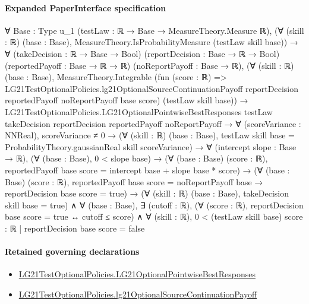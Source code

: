\documentclass[10pt]{article}
\begin{document}
\paragraph{Expanded PaperInterface specification}
\begin{ReviewVerbatim}
∀ {Base : Type u_1} (testLaw : ℝ → Base → MeasureTheory.Measure ℝ),
  (∀ (skill : ℝ) (base : Base), MeasureTheory.IsProbabilityMeasure (testLaw skill base)) →
    ∀ (takeDecision : ℝ → Base → Bool) (reportDecision : Base → ℝ → Bool) (reportedPayoff : Base → ℝ → ℝ)
      (noReportPayoff : Base → ℝ),
      (∀ (skill : ℝ) (base : Base),
          MeasureTheory.Integrable
            (fun (score : ℝ) =>
              LG21TestOptionalPolicies.lg21OptionalSourceContinuationPayoff reportDecision reportedPayoff noReportPayoff
                base score)
            (testLaw skill base)) →
        LG21TestOptionalPolicies.LG21OptionalPointwiseBestResponses testLaw takeDecision reportDecision reportedPayoff
            noReportPayoff →
          ∀ (scoreVariance : NNReal),
            scoreVariance ≠ 0 →
              (∀ (skill : ℝ) (base : Base), testLaw skill base = ProbabilityTheory.gaussianReal skill scoreVariance) →
                ∀ (intercept slope : Base → ℝ),
                  (∀ (base : Base), 0 < slope base) →
                    (∀ (base : Base) (score : ℝ), reportedPayoff base score = intercept base + slope base * score) →
                      (∀ (base : Base) (score : ℝ),
                          reportedPayoff base score = noReportPayoff base → reportDecision base score = true) →
                        (∀ (skill : ℝ) (base : Base), takeDecision skill base = true) ∧
                          ∀ (base : Base),
                            ∃ (cutoff : ℝ),
                              (∀ (score : ℝ), reportDecision base score = true ↔ cutoff ≤ score) ∧
                                ∀ (skill : ℝ), 0 < (testLaw skill base) {score : ℝ | reportDecision base score = false}
\end{ReviewVerbatim}

\paragraph{Retained governing declarations}
\begin{itemize}\raggedright
\item \hyperlink{paper-prerequisite-c2c420f15bf99600}{LG21\allowbreak{}Test\allowbreak{}Optional\allowbreak{}Policies.\allowbreak{}LG21\allowbreak{}Optional\allowbreak{}Pointwise\allowbreak{}Best\allowbreak{}Responses}
\item \hyperlink{governing-declaration-ced20498d7fb3845}{LG21\allowbreak{}Test\allowbreak{}Optional\allowbreak{}Policies.\allowbreak{}lg21\allowbreak{}Optional\allowbreak{}Source\allowbreak{}Continuation\allowbreak{}Payoff}
\end{itemize}
\end{document}
